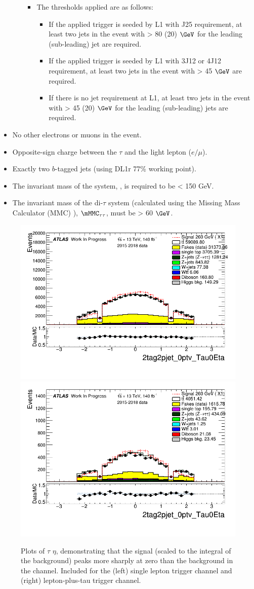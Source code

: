 \begin{itemize}
\begin{itemize}
\begin{itemize}
			\item The \pT thresholds applied are as follows:
				 \begin{itemize}
					\item If the applied trigger is seeded by L1 with J25 requirement, 
					at least two jets in the event with \pT > 80 (20) $\GeV$ for the leading (sub-leading) jet are required.
					\item If the applied trigger is seeded by L1 with 3J12 or 4J12 requirement,
					at least two jets in the event with \pT > 45 $\GeV$ are required.
					\item If there is no jet requirement at L1, at least two jets in the event with \pT > 45 (20) $\GeV$ for the leading (sub-leading) jets are required.
				\end{itemize}
		\end{itemize}
	\end{itemize}
\item No other electrons or muons in the event.
\item Opposite-sign charge between the $\tau$ and the light lepton ($e/\mu$).
\item Exactly two $b$-tagged jets (using DL1r 77\% working point).
\item The invariant mass of the \bbbar system, \mbb, is required to be < 150 GeV.
\item The invariant mass of the di-$\tau$ system (calculated using the Missing Mass Calculator (MMC) \cite{Elagin:2010aw}),
$\mMMC_{\tau\tau}$, must be > 60 $\GeV$.
\end{itemize}

\begin{figure}
\centering
\includegraphics[width=.45\textwidth]{figures/selection/2tag2pjet_0ptv_Tau0Eta_SR_ALLFAKES_SLT_ALL_NR_TRBins.png}
\includegraphics[width=.45\textwidth]{figures/selection/2tag2pjet_0ptv_Tau0Eta_SR_ALLFAKES_LTT_ALL_NR_TRBins.png} \\
\caption{Plots of $\tau$ $\eta$, demonstrating that the signal (scaled to the integral of the background) peaks more sharply at zero than the background in the \lephad channel. Included for the (left) single lepton trigger channel and (right) lepton-plus-tau trigger channel.}
\label{fig:tau_eta_23}
\end{figure}

